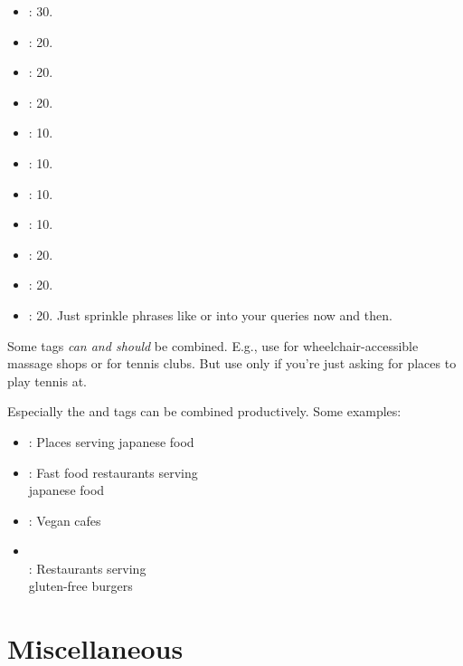\begin{itemize}
\item {}: 30.
\item {}: 20.
\item {}: 20.
\item {}: 20.
\item {}: 10.
\item {}: 10.
\item {}: 10.
\item {}: 10.
\item {}: 20.
\item {}: 20.
\item {}: 20. Just sprinkle phrases like
   or  into your queries now and then.
\end{itemize}

Some tags \emph{can and should} be combined. E.g., use
 for wheelchair-accessible massage shops or
 for tennis clubs. But use only
 if you’re just asking for places to play tennis at.

Especially the  and  tags can be combined
productively. Some examples:

\begin{itemize}
\item {}: Places serving japanese food
\item {}: Fast food restaurants
  serving\\japanese food
\item {}: Vegan cafes
\item {}\\
  : Restaurants serving\\gluten-free
  burgers
\end{itemize}

\section{Miscellaneous}

